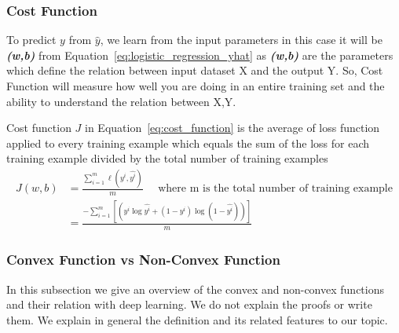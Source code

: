 \subsubsection{Cost Function}
To predict $y$ from $\widehat{y}$, we learn from the input parameters in this case it will be \textbf{\textit{(w,b)}} from Equation~\eqref{eq:logistic_regression_yhat} as \textbf{\textit{(w,b)}} are the parameters which define the relation between input dataset X and the output Y. So, Cost Function will measure how well you are doing in an entire training set and the ability to understand the relation between X,Y.

Cost function \textbf{\textit{$J$}} in Equation~\eqref{eq:cost_function} is the average of loss function applied to every training example which equals the sum of the loss for each training example divided by the total number of training examples%
%
\begin{equation}\label{eq:cost_function}
 \begin{split}
 J(w,b) & = \frac{\sum_{i=1}^{m} \ell(y^i,\widehat{y^i})}{m} \quad \text{ where m is the total number of training example} \\
 & = \frac {- \sum_{i=1}^{m} [(y^i \log \widehat{y^i} + (1-y^i) \log (1-\widehat{y^i}))]}{m} 
 \end{split}
\end{equation}%
%
\subsubsection{Convex Function vs Non-Convex Function }

In this subsection we give an overview of the convex and non-convex functions and their relation with deep learning. We do not explain the proofs or write them. We explain in general the definition and its related features to our topic.


